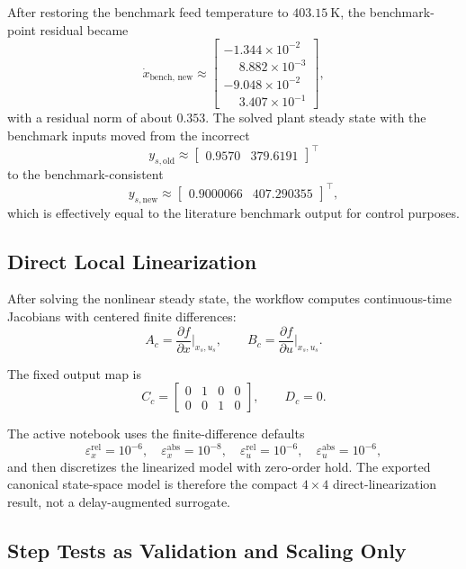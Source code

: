 After restoring the benchmark feed temperature to \(403.15~\mathrm{K}\), the benchmark-point residual became
\[
\dot x_{\text{bench, new}} \approx
\begin{bmatrix}
-1.344 \times 10^{-2}\\
\phantom{-}8.882 \times 10^{-3}\\
-9.048 \times 10^{-2}\\
\phantom{-}3.407 \times 10^{-1}
\end{bmatrix},
\]
with a residual norm of about \(0.353\). The solved plant steady state with the benchmark inputs moved from the incorrect
\[
y_{s,\text{old}} \approx \begin{bmatrix} 0.9570 & 379.6191 \end{bmatrix}^{\top}
\]
to the benchmark-consistent
\[
y_{s,\text{new}} \approx \begin{bmatrix} 0.9000066 & 407.290355 \end{bmatrix}^{\top},
\]
which is effectively equal to the literature benchmark output for control purposes.

\subsection{Direct Local Linearization}

After solving the nonlinear steady state, the workflow computes continuous-time Jacobians with centered finite differences:
\[
A_c = \frac{\partial f}{\partial x}\bigg|_{x_s,u_s},\qquad
B_c = \frac{\partial f}{\partial u}\bigg|_{x_s,u_s}.
\]

The fixed output map is
\[
C_c =
\begin{bmatrix}
0 & 1 & 0 & 0 \\
0 & 0 & 1 & 0
\end{bmatrix},
\qquad
D_c = 0.
\]

The active notebook uses the finite-difference defaults
\[
\varepsilon_x^{\text{rel}} = 10^{-6},\quad
\varepsilon_x^{\text{abs}} = 10^{-8},\quad
\varepsilon_u^{\text{rel}} = 10^{-6},\quad
\varepsilon_u^{\text{abs}} = 10^{-6},
\]
and then discretizes the linearized model with zero-order hold. The exported canonical state-space model is therefore the compact \(4 \times 4\) direct-linearization result, not a delay-augmented surrogate.

\subsection{Step Tests as Validation and Scaling Only}

